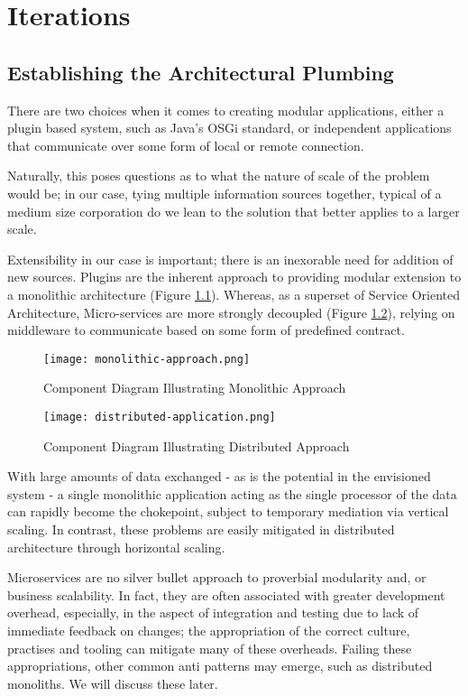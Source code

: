 \chapter{Iterations}

\section{Establishing the Architectural Plumbing}

There are two choices when it comes to creating modular applications, either a plugin based system, such as Java’s OSGi standard, or independent applications that communicate over some form of local or remote connection.

Naturally, this poses questions as to what the nature of scale of the problem would be; in our case, tying multiple information sources together, typical of a medium size corporation do we lean to the solution that better applies to a larger scale.

Extensibility in our case is important; there is an inexorable need for addition of new sources. Plugins are the inherent approach to providing modular extension to a monolithic architecture (Figure \ref{fig:monolithic-approach}). Whereas, as a superset of Service Oriented Architecture, Micro-services are more strongly decoupled (Figure \ref{fig:distributed-approach}), relying on middleware to communicate based on some form of predefined contract.

\begin{figure}[h!]
	\centering
	\texttt{[image: monolithic-approach.png]}
	\caption{Component Diagram Illustrating Monolithic Approach}
	\label{fig:monolithic-approach}
\end{figure}

\begin{figure}[h!]
	\centering
	\texttt{[image: distributed-application.png]}
	\caption{Component Diagram Illustrating Distributed Approach}
	\label{fig:distributed-approach}
\end{figure}

With large amounts of data exchanged - as is the potential in the envisioned system - a single monolithic application acting as the single processor of the data can rapidly become the chokepoint, subject to temporary mediation via vertical scaling. In contrast, these problems are easily mitigated in distributed architecture through horizontal scaling.

Microservices are no silver bullet approach to proverbial modularity and, or business scalability. In fact, they are often associated with greater development overhead, especially, in the aspect of integration and testing due to lack of immediate feedback on changes; the appropriation of the correct culture, practises and tooling can mitigate many of these overheads. Failing these appropriations, other common anti patterns may emerge, such as distributed monoliths. We will discuss these later.

